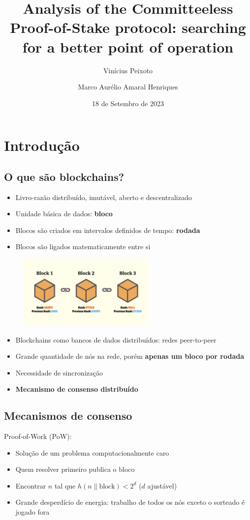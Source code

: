 \documentclass{beamer}
\title{Analysis of the Committeeless Proof-of-Stake protocol: searching for a better point of operation}
\author{Vinícius Peixoto\inst{1} \and Marco Aurélio Amaral Henriques\inst{1}}
\institute{\inst{1} Faculdade de Engenharia Elétrica e de Computação (FEEC) - Unicamp}
\date{18 de Setembro de 2023}
\begin{document}
\frame{\titlepage}

\section{Introdução}
\subsection{O que são blockchains?}
\begin{frame}
\begin{itemize}
    \item Livro-razão distribuído, imutável, aberto e descentralizado
    \item Unidade básica de dados: \textbf{bloco}
    \item Blocos são criados em intervalos definidos de tempo: \textbf{rodada}
    \item Blocos são ligados matematicamente entre si
\end{itemize}

\begin{figure}
    \centering
    \includegraphics[width=0.6\textwidth]{images/blocks.jpg}
\end{figure}
\end{frame}

\begin{frame}
\begin{itemize}
    \item Blockchains como bancos de dados distribuídos: redes peer-to-peer
    \item Grande quantidade de nós na rede, porém \textbf{apenas um bloco por rodada}
    \item Necessidade de sincronização
    \item \textbf{Mecanismo de consenso distribuído}
\end{itemize}
\end{frame}

\subsection{Mecanismos de consenso}
\begin{frame}
Proof-of-Work (PoW):
\begin{itemize}
    \item Solução de um problema computacionalmente caro
    \item Quem resolver primeiro publica o bloco
    \item Encontrar $n$ tal que $h(n \parallel \text{block}) < 2^d$ ($d$ ajustável)
    \item Grande desperdício de energia: trabalho de todos os nós exceto o sorteado é jogado fora
\end{itemize}
\end{frame}
\end{document}
